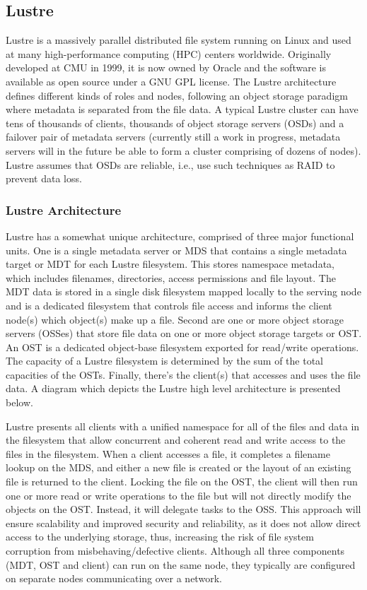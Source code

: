 \documentclass[11pt]{article}
\begin{document}
\subsection{Lustre}
Lustre is a massively parallel distributed file system running on Linux 
and used at many high-performance computing (HPC) centers worldwide. 
Originally developed at CMU in 1999, it is now owned by Oracle and the 
software is available as open source under a GNU GPL license. The Lustre 
architecture defines different kinds of roles and nodes, following an object 
storage paradigm where metadata is separated from the file data. A typical 
Lustre cluster can have tens of thousands of clients, thousands of object 
storage servers (OSDs) and a failover pair of metadata servers (currently 
still a work in progress, metadata servers will in the future be able to 
form a cluster comprising of dozens of nodes). Lustre assumes that OSDs 
are reliable, i.e., use such techniques as RAID to prevent data loss.

\subsubsection{Lustre Architecture}
Lustre has a somewhat unique architecture, comprised of three major 
functional units. One is a single metadata server or MDS that contains 
a single metadata target or MDT for each Lustre filesystem. This stores 
namespace metadata, which includes filenames, directories, access 
permissions and file layout. The MDT data is stored in a single disk 
filesystem mapped locally to the serving node and is a dedicated 
filesystem that controls file access and informs the client node(s) 
which object(s) make up a file. Second are one or more object storage 
servers (OSSes) that store file data on one or more object storage 
targets or OST. An OST is a dedicated object-base filesystem exported 
for read/write operations. The capacity of a Lustre filesystem is 
determined by the sum of the total capacities of the OSTs. Finally, 
there's the client(s) that accesses and uses the file data. A diagram 
which depicts the Lustre high level architecture is presented below.




Lustre presents all clients with a unified namespace for all of the 
files and data in the filesystem that allow concurrent and coherent 
read and write access to the files in the filesystem. When a client 
accesses a file, it completes a filename lookup on the MDS, and 
either a new file is created or the layout of an existing file is 
returned to the client. Locking the file on the OST, the client will 
then run one or more read or write operations to the file but will 
not directly modify the objects on the OST. Instead, it will delegate 
tasks to the OSS. This approach will ensure scalability and improved 
security and reliability, as it does not allow direct access to the 
underlying storage, thus, increasing the risk of file system corruption 
from misbehaving/defective clients. Although all three components 
(MDT, OST and client) can run on the same node, they typically are 
configured on separate nodes communicating over a network.
\end{document}
